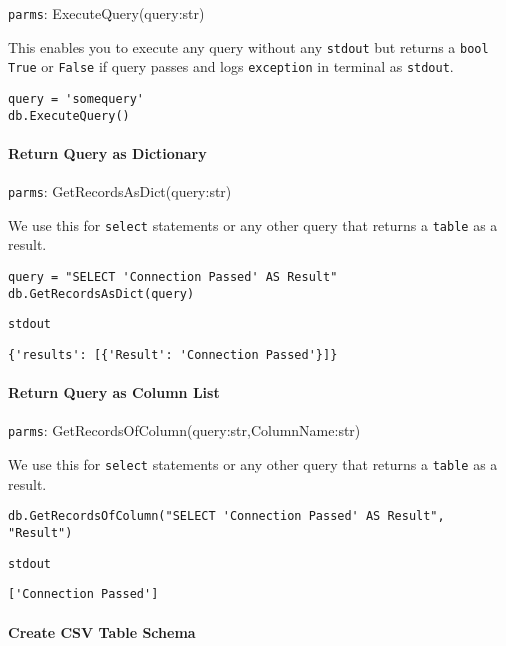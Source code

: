 \texttt{parms}: ExecuteQuery(query:str)

This enables you to execute any query without any \texttt{stdout} but
returns a \texttt{bool} \texttt{True} or \texttt{False} if query passes
and logs \texttt{exception} in terminal as \texttt{stdout}.

\begin{verbatim}
query = 'somequery'
db.ExecuteQuery()
\end{verbatim}

\hypertarget{return-query-as-dictionary}{%
\paragraph{Return Query as
Dictionary}\label{return-query-as-dictionary}}

\texttt{parms}: GetRecordsAsDict(query:str)

We use this for \texttt{select} statements or any other query that
returns a \texttt{table} as a result.

\begin{verbatim}
query = "SELECT 'Connection Passed' AS Result"
db.GetRecordsAsDict(query)
\end{verbatim}

\texttt{stdout}

\begin{verbatim}
{'results': [{'Result': 'Connection Passed'}]}
\end{verbatim}

\hypertarget{return-query-as-column-list}{%
\paragraph{Return Query as Column
List}\label{return-query-as-column-list}}

\texttt{parms}: GetRecordsOfColumn(query:str,ColumnName:str)

We use this for \texttt{select} statements or any other query that
returns a \texttt{table} as a result.

\begin{verbatim}
db.GetRecordsOfColumn("SELECT 'Connection Passed' AS Result", "Result")
\end{verbatim}

\texttt{stdout}

\begin{verbatim}
['Connection Passed']
\end{verbatim}

\hypertarget{create-csv-table-schema}{%
\paragraph{Create CSV Table Schema}\label{create-csv-table-schema}}

